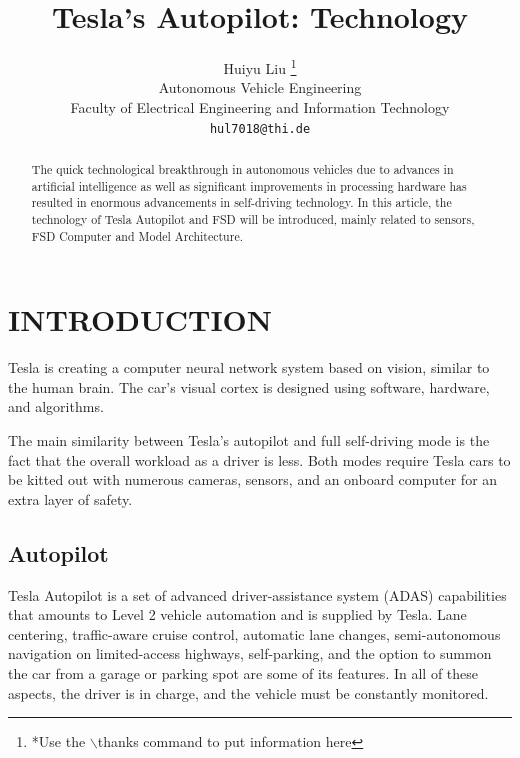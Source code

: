 \documentclass[letterpaper, 10 pt, conference]{ieeeconf}  %
\title{\LARGE \bf
Tesla's Autopilot: Technology
}
\author{ \parbox{3 in}{\centering Huiyu Liu
        \thanks{*Use the $\backslash$thanks command to put information here}\\
        Autonomous Vehicle Engineering\\
        Faculty of Electrical Engineering and Information Technology\\
        {\tt\small hul7018@thi.de}}
}
\begin{document}
\maketitle
\thispagestyle{empty}
\pagestyle{empty}


\begin{abstract}
The quick technological breakthrough in autonomous vehicles due to advances in artificial intelligence as well as significant improvements in processing hardware has resulted in enormous advancements in self-driving technology. In this article, the technology of Tesla Autopilot and FSD will be introduced, mainly related to sensors, FSD Computer and Model Architecture.
\end{abstract}



\section{INTRODUCTION}

Tesla is creating a computer neural network system based on vision, similar to the human brain. The car's visual cortex is designed using software, hardware, and algorithms.

The main similarity between Tesla's autopilot and full self-driving mode is the fact that the overall workload as a driver is less. Both modes require Tesla cars to be kitted out with numerous cameras, sensors, and an onboard computer for an extra layer of safety\cite{tesla_2021}.

\subsection{Autopilot}

Tesla Autopilot is a set of advanced driver-assistance system (ADAS) capabilities that amounts to Level 2 vehicle automation and is supplied by Tesla. Lane centering, traffic-aware cruise control, automatic lane changes, semi-autonomous navigation on limited-access highways, self-parking, and the option to summon the car from a garage or parking spot are some of its features\cite{maitraapproach}. In all of these aspects, the driver is in charge, and the vehicle must be constantly monitored\cite{tesla_2021}.
\end{document}
